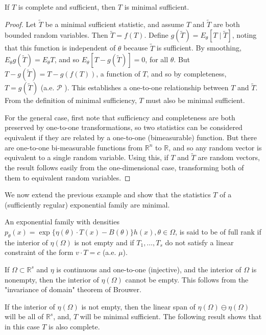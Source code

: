\begin{thm}
    If $T$ is complete and sufficient, then $T$ is minimal sufficient.
\end{thm}
\begin{proof}
    Let $\tilde{T}$ be a minimal sufficient statistic, and assume $T$ and $\tilde{T}$ are both bounded random variables. Then $\tilde{T}=f(T)$. Define $g(\tilde{T})=E_\theta[T \mid \tilde{T}]$, noting that this function is independent of $\theta$ because $\tilde{T}$ is sufficient. By smoothing, $E_\theta g(\tilde{T})=E_\theta T$, and so $E_\theta[T-g(\tilde{T})]=0$, for all $\theta$. But $T-g(\tilde{T})=T-g(f(T))$, a function of $T$, and so by completeness, $T=g(\tilde{T})$ (a.e. $\mathcal{P}$ ). This establishes a one-to-one relationship between $T$ and $\tilde{T}$. From the definition of minimal sufficiency, $T$ must also be minimal sufficient.

    For the general case, first note that sufficiency and completeness are both preserved by one-to-one transformations, so two statistics can be considered equivalent if they are related by a one-to-one (bimeasurable) function. But there are one-to-one bi-measurable functions from $\mathbb{R}^n$ to $\mathbb{R}$, and so any random vector is equivalent to a single random variable. Using this, if $T$ and $\tilde{T}$ are random vectors, the result follows easily from the one-dimensional case, transforming both of them to equivalent random variables.
\end{proof}

We now extend the previous example and show that the statistics $T$ of a (sufficiently regular) exponential family are minimal.

\begin{de}
    An exponential family with densities $p_\theta(x)=\exp \{\eta(\theta) \cdot T(x)-B(\theta)\} h(x), \theta \in \Omega$, is said to be of full rank if the interior of $\eta(\Omega)$ is not empty and if $T_1, \ldots, T_s$ do not satisfy a linear constraint of the form $v \cdot T=c$ (a.e. $\mu$).
\end{de}

\begin{remark}
    If $\Omega \subset \mathbb{R}^s$ and $\eta$ is continuous and one-to-one (injective), and the interior of $\Omega$ is nonempty, then the interior of $\eta(\Omega)$ cannot be empty. This follows from the "invariance of domain" theorem of Brouwer.
\end{remark}


If the interior of $\eta(\Omega)$ is not empty, then the linear span of $\eta(\Omega) \ominus \eta(\Omega)$ will be all of $\mathbb{R}^s$, and, $T$ will be minimal sufficient. The following result shows that in this case $T$ is also complete.

